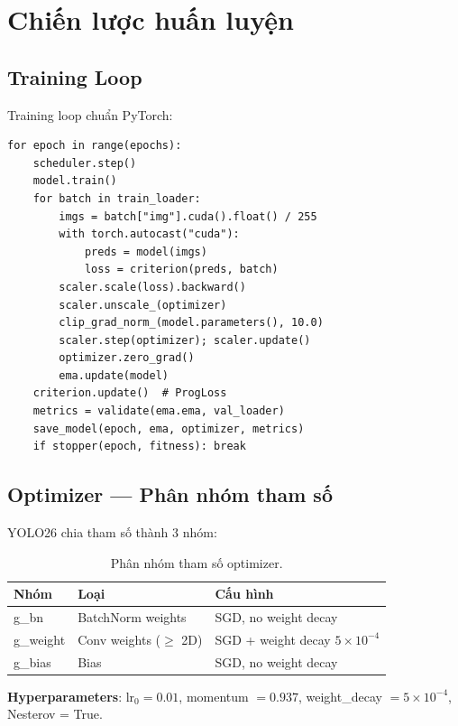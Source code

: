 \chapter{Chiến lược huấn luyện}
\label{ch:training}

\section{Training Loop}

Training loop chuẩn PyTorch:
\begin{verbatim}
for epoch in range(epochs):
    scheduler.step()
    model.train()
    for batch in train_loader:
        imgs = batch["img"].cuda().float() / 255
        with torch.autocast("cuda"):
            preds = model(imgs)
            loss = criterion(preds, batch)
        scaler.scale(loss).backward()
        scaler.unscale_(optimizer)
        clip_grad_norm_(model.parameters(), 10.0)
        scaler.step(optimizer); scaler.update()
        optimizer.zero_grad()
        ema.update(model)
    criterion.update()  # ProgLoss
    metrics = validate(ema.ema, val_loader)
    save_model(epoch, ema, optimizer, metrics)
    if stopper(epoch, fitness): break
\end{verbatim}

\section{Optimizer --- Phân nhóm tham số}

YOLO26 chia tham số thành 3 nhóm:

\begin{table}[H]
\centering
\begin{tabular}{lll}
\toprule
\textbf{Nhóm} & \textbf{Loại} & \textbf{Cấu hình} \\
\midrule
g\_bn & BatchNorm weights & SGD, no weight decay \\
g\_weight & Conv weights ($\geq$ 2D) & SGD + weight decay $5 \times 10^{-4}$ \\
g\_bias & Bias & SGD, no weight decay \\
\bottomrule
\end{tabular}
\caption{Phân nhóm tham số optimizer.}
\end{table}

\textbf{Hyperparameters}: lr$_0 = 0.01$, momentum $= 0.937$, weight\_decay $= 5 \times 10^{-4}$, Nesterov = True.

